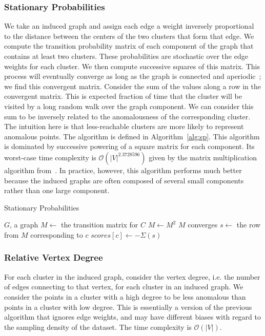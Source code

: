 \subsubsection{Stationary Probabilities}
\label{subsubsec:methods:individual-algorithms:sp}
We take an induced graph and assign each edge a weight inversely proportional to the distance between the centers of the two clusters that form that edge.
We compute the transition probability matrix of each component of the graph that contains at least two clusters.
These probabilities are stochastic over the edge weights for each cluster.
We then compute successive squares of this matrix.
This process will eventually converge as long as the graph is connected and aperiodic~\cite{levin2017markov}; we find this convergent matrix.
Consider the sum of the values along a row in the convergent matrix.
This is expected fraction of time that the cluster will be visited by a long random walk over the graph component.
We can consider this sum to be inversely related to the anomalousness of the corresponding cluster.
The intuition here is that less-reachable clusters are more likely to represent anomalous points.
The algorithm is defined in Algorithm~\ref{alg:sp}.
This algorithm is dominated by successive powering of a square matrix for each component.
Its worst-case time complexity is $\mathcal{O}(|V|^{2.3728596})$ given by the matrix multiplication algorithm from~\cite{alman2021refined}.
In practice, however, this algorithm performs much better because the induced graphs are often composed of several small components rather than one large component.

\begin{algorithm}[h]
    \caption{Stationary Probabilities}
    \label{alg:sp}
\begin{algorithmic}[1]
    \REQUIRE $G$, a graph
        \STATE $M \gets$ the transition matrix for $C$
        \REPEAT
            \STATE $M \gets M^2$
        \UNTIL $M$ converges
            \STATE $s \gets $ the row from $M$ corresponding to $c$
            \STATE $scores[c] \gets -\Sigma(s)$ 
        \ENDFOR
    \ENDFOR
\end{algorithmic}
\end{algorithm}

\subsubsection{Relative Vertex Degree}
\label{subsubsec:methods:individual-algorithms:rvd}
For each cluster in the induced graph, consider the vertex degree, i.e. the number of edges connecting to that vertex, for each cluster in an induced graph.
We consider the points in a cluster with a high degree to be less anomalous than points in a cluster with low degree.
This is essentially a version of the previous algorithm that ignores edge weights, and may have different biases with regard to the sampling density of the dataset.
The time complexity is $\mathcal{O}(|V|)$.

